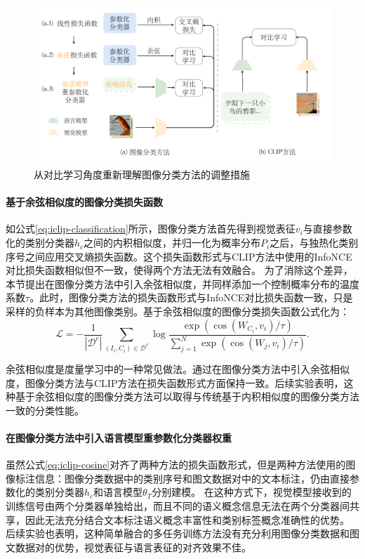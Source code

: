 \begin{figure}
  \centering
  \includegraphics[width=1.0\linewidth]{figures/iclip-adapt-v2.pdf}
  \caption{从对比学习角度重新理解图像分类方法的调整措施}
  \label{fig:iclip-adapt}
\end{figure}

\paragraph{基于余弦相似度的图像分类损失函数} 如公式\eqref{eq:iclip-classification}所示，图像分类方法首先得到视觉表征$v_{i}$与直接参数化的类别分类器$h_{c}$之间的内积相似度，并归一化为概率分布$P_i$之后，与独热化类别序号之间应用交叉熵损失函数。这个损失函数形式与CLIP方法中使用的InfoNCE对比损失函数相似但不一致，使得两个方法无法有效融合。
为了消除这个差异，本节提出在图像分类方法中引入余弦相似度，并同样添加一个控制概率分布的温度系数$\tau$。此时，图像分类方法的损失函数形式与InfoNCE对比损失函数一致，只是采样的负样本为其他图像类别。基于余弦相似度的图像分类损失函数公式化为：
\begin{equation}
    \mathcal{L}=-\frac{1}{\left|\mathcal{D}^{c}\right|} \sum_{\left(I_{i}, C_{i}\right) \in \mathcal{D}^{c}} \log \frac{\exp \left(\cos \left(W_{C_{i}}, v_{i}\right) / \tau\right)}{\sum_{j=1}^{N} \exp \left(\cos \left(W_{j}, v_{i}\right) / \tau\right)}.
    \label{eq:iclip-cosine}
\end{equation}

余弦相似度是度量学习\cite{nguyen2010cosine}中的一种常见做法。通过在图像分类方法中引入余弦相似度，图像分类方法与CLIP方法在损失函数形式方面保持一致。后续实验表明，这种基于余弦相似度的图像分类方法可以取得与传统基于内积相似度的图像分类方法一致的分类性能。

\paragraph{在图像分类方法中引入语言模型重参数化分类器权重} 虽然公式\eqref{eq:iclip-cosine}对齐了两种方法的损失函数形式，但是两种方法使用的图像标注信息：图像分类数据中的类别序号和图文数据对中的文本标注，仍由直接参数化的类别分类器$h_{c}$和语言模型$\theta_{T}$分别建模。
在这种方式下，视觉模型接收到的训练信号由两个分类器单独给出，而且不同的语义概念信息无法在两个分类器间共享，因此无法充分结合文本标注语义概念丰富性和类别标签概念准确性的优势。
后续实验也表明，这种简单融合的多任务训练方法没有充分利用图像分类数据和图文数据对的优势，视觉表征与语言表征的对齐效果不佳。

